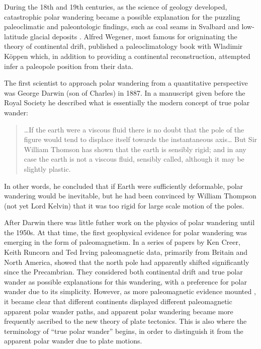 During the 18th and 19th centuries, as the science of geology developed, catastrophic polar wandering
became a possible explanation for the puzzling paleoclimatic and paleontologic findings, such as coal
seams in Svalbard and low-latitude glacial deposits \citep{barrell1914status}.
Alfred Wegener, most famous for origninating the theory of continental drift,
published a paleoclimatology book with Wladimir K\"oppen \citep{koppen1924} which,
in addition to providing a continental reconstruction, attempted infer a paleopole
position from their data.

The first scientist to approach polar wandering from a quantitative perspective was
George Darwin (son of Charles) in 1887. In a manuscript given before the Royal Society \citep{darwin1887influence}
he described what is essentially the modern concept of true polar wander:
\begin{quote}
\ldots If the earth were a viscous fluid there is no doubt that the pole of the figure would
tend to displace itself towards the instantaneous axis\ldots 
But Sir William Thomson has shown that the earth is sensibly rigid; 
and in any case the earth is not a viscous fluid, sensibly called, although it may be slightly plastic.
\end{quote}
In other words, he concluded that if Earth were sufficiently deformable, 
polar wandering would be inevitable, but he had been convinced by William Thompson (not yet Lord Kelvin)
that it was too rigid for large scale motion of the poles.

After Darwin there was little futher work on the physics of polar wandering
until the 1950s. At that time, the first geophysical evidence for polar wandering
was emerging in the form of paleomagnetism.
In a series of papers by Ken Creer, Keith Runcorn and Ted Irving 
\citep{creer1954direction, runcorn1955rock, creer1957geophysical} paleomagnetic data,
primarily from Britain and North America, showed that the north pole had apparently shifted significantly
since the Precambrian. They considered both continental drift and true polar wander
as possible explanations for this wandering, with a preference for polar wander due to its simplicity.
However, as more paleomagnetic evidence mounted \citep[e.g.][]{irving1958polar}, it became clear
that different continents displayed different paleomagnetic apparent polar wander paths,
and apparent polar wandering became more frequently ascribed to the new theory of plate tectonics.
This is also where the terminology of ``true polar wander'' begins, in order to distinguish
it from the apparent polar wander due to plate motions.

